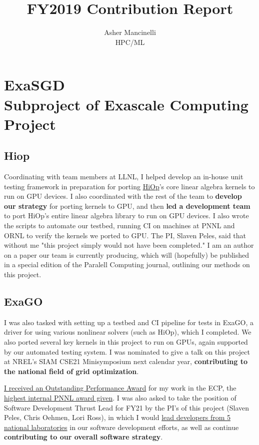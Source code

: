 \documentclass{article}
\title{FY2019 Contribution Report}
\author{Asher Mancinelli \\ HPC/ML}
\begin{document}
\maketitle

\section{ExaSGD \\ 
  {\small Subproject of Exascale Computing Project}}

\subsection{Hiop}

Coordinating with team members at LLNL, I helped develop an in-house unit testing framework in preparation for porting \href{https://github.com/LLNL/hiop}{HiOp}'s core linear algebra kernels to run on GPU devices.
I also coordinated with the rest of the team to \textbf{develop our strategy} for porting kernels to GPU, and then \textbf{led a development team} to port HiOp's entire linear algebra library to run on GPU devices.
I also wrote the scripts to automate our testbed, running CI on machines at PNNL and ORNL to verify the kernels we ported to GPU.
The PI, Slaven Peles, said that without me "this project simply would not have been completed."
I am an author on a paper our team is currently producing, which will (hopefully) be published in a special edition of the Paralell Computing journal, outlining our methods on this project.

\subsection{ExaGO}

I was also tasked with setting up a testbed and CI pipeline for tests in ExaGO, a driver for using various nonlinear solvers (such as HiOp), which I completed.
We also ported several key kernels in this project to run on GPUs, again supported by our automated testing system.
I was nominated to give a talk on this project at NREL's SIAM CSE21 Minisymposium next calendar year, \textbf{contributing to the national field of grid optimization}.

\bigskip

\underline{I received an Outstanding Performance Award} for my work in the ECP, the \underline{highest internal PNNL award given}.
I was also asked to take the position of Software Development Thrust Lead for FY21 by the PI's of this project (Slaven Peles, Chris Oehmen, Lori Ross), in which I would \underline{lead developers from 5 national laboratories} in our software development efforts, as well as continue \textbf{contributing to our overall software strategy}.
\end{document}
